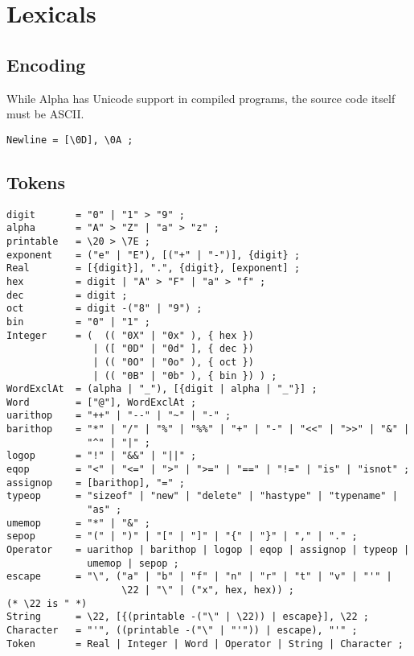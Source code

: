 \documentclass{article}
\begin{document}
\section{Lexicals}
\label{sec:lexicals}

\subsection{Encoding}
\label{sec:encoding}
While Alpha has Unicode support in compiled programs, the source code itself
must be ASCII.
\begin{verbatim}
Newline = [\0D], \0A ;
\end{verbatim}

\subsection{Tokens}
\label{sub:lexicals:tokens}
\begin{verbatim}
digit       = "0" | "1" > "9" ;
alpha       = "A" > "Z" | "a" > "z" ;
printable   = \20 > \7E ;
exponent    = ("e" | "E"), [("+" | "-")], {digit} ;
Real        = [{digit}], ".", {digit}, [exponent] ;
hex         = digit | "A" > "F" | "a" > "f" ;
dec         = digit ;
oct         = digit -("8" | "9") ;
bin         = "0" | "1" ;
Integer     = (  (( "0X" | "0x" ), { hex })
               | ([ "0D" | "0d" ], { dec })
               | (( "0O" | "0o" ), { oct })
               | (( "0B" | "0b" ), { bin }) ) ;
WordExclAt  = (alpha | "_"), [{digit | alpha | "_"}] ;
Word        = ["@"], WordExclAt ;
uarithop    = "++" | "--" | "~" | "-" ;
barithop    = "*" | "/" | "%" | "%%" | "+" | "-" | "<<" | ">>" | "&" |
              "^" | "|" ;
logop       = "!" | "&&" | "||" ;
eqop        = "<" | "<=" | ">" | ">=" | "==" | "!=" | "is" | "isnot" ;
assignop    = [barithop], "=" ;
typeop      = "sizeof" | "new" | "delete" | "hastype" | "typename" |
              "as" ;
umemop      = "*" | "&" ;
sepop       = "(" | ")" | "[" | "]" | "{" | "}" | "," | "." ;
Operator    = uarithop | barithop | logop | eqop | assignop | typeop |
              umemop | sepop ;
escape      = "\", ("a" | "b" | "f" | "n" | "r" | "t" | "v" | "'" |
                    \22 | "\" | ("x", hex, hex)) ;
(* \22 is " *)
String      = \22, [{(printable -("\" | \22)) | escape}], \22 ;
Character   = "'", ((printable -("\" | "'")) | escape), "'" ;
Token       = Real | Integer | Word | Operator | String | Character ;
\end{verbatim}
\end{document}
